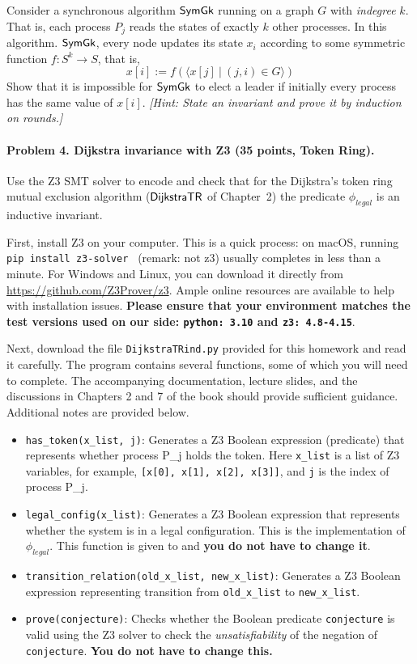 \documentclass[11pt]{article}
\begin{document}
Consider a synchronous algorithm ${\operatorname{\mathsf{SymGk}}}$ running on a graph $G$ with {\em indegree\/} $k$. That is, each process $P_j$ reads the states of exactly $k$ other processes. In this algorithm. ${\operatorname{\mathsf{SymGk}}}$, every node updates its state $x_i$ according to some symmetric function $f:S^k \rightarrow S$, that is, 
\[
x[i] := f(\langle x[j] \ | \ (j,i) \in G\rangle)
\]
Show that it is impossible for ${\operatorname{\mathsf{SymGk}}}$  to elect a leader if initially every process has the same value of $x[i]$. {\em [Hint: State an invariant and prove it by induction on rounds.]}






\paragraph{Problem 4. Dijkstra invariance with Z3 (35 points, Token Ring).} 
Use the Z3 SMT solver to encode and check that for the Dijkstra's token ring mutual exclusion algorithm (${\operatorname{\mathsf{DijkstraTR}}}$ of Chapter~2) the predicate $\phi_{\mathit{legal}}$ is an inductive invariant. 

First, install Z3 on your computer. This is a quick process: on macOS, running \texttt{pip install z3-solver } (remark: not z3) usually completes in less than a minute. For Windows and Linux, you can download it directly from \href{https://github.com/Z3Prover/z3}{https://github.com/Z3Prover/z3}. Ample online resources are available to help with installation issues. \textbf{Please ensure that your environment matches the test versions used on our side: \texttt{python: 3.10} and \texttt{z3: 4.8-4.15}}. 

Next, download the file \texttt{DijkstraTRind.py} provided for this homework and read it carefully. The program contains several functions, some of which you will need to complete. The accompanying documentation, lecture slides, and the discussions in Chapters 2 and 7 of the book should provide sufficient guidance. Additional notes are provided below.
 

\begin{itemize}
\item \texttt{has\_token(x\_list, j)}: Generates a Z3 Boolean expression (predicate) that represents whether process P\_j holds the token. Here  \texttt{x\_list} is a list of Z3 variables, for example, \texttt{[x[0], x[1], x[2], x[3]]}, and  \texttt{j} is the index of process P\_j.
\item \texttt{legal\_config(x\_list)}: Generates a Z3 Boolean expression that represents whether the system is in a legal configuration. This is the implementation of $\phi_{\mathit{legal}}$. This function is given to and {\bf you do not have to change it\/}.
%
\item \texttt{transition\_relation(old\_x\_list, new\_x\_list)}: Generates a Z3 Boolean expression representing transition from \texttt{old\_x\_list} to \texttt{new\_x\_list}.
\item \texttt{prove(conjecture)}: Checks whether the Boolean predicate \texttt{conjecture} is valid using the Z3 solver to check the {\em unsatisfiability\/} of the negation of \texttt{conjecture}. {\bf You do not have to change this.\/}
\end{itemize}
\end{document}
